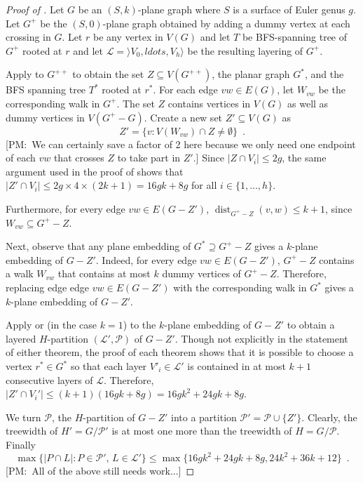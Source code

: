 \documentclass{patmorin}
\newcommand{\note}[2]{{\color{red}[#1:~#2]}}
\DeclareMathOperator{\dist}{dist}
\begin{document}
\begin{proof}[Proof of ]
  Let $G$ be an $(S,k)$-plane graph where $S$ is a surface of Euler genus $g$.  Let $G^+$ be the $(S,0)$-plane graph obtained by adding a dummy vertex at each crossing in $G$.  Let $r$ be any vertex in $V(G)$ and let $T$ be BFS-spanning tree of $G^+$ rooted at $r$ and let $\mathcal{L}=\rangle V_0,ldots,V_h\rangle$ be the resulting layering of $G^+$.
    
  Apply  to $G^{++}$ to obtain the set $Z\subseteq V(G^{++})$, the planar graph $G^*$, and the BFS spanning tree $T^*$ rooted at $r^*$.  For each edge $vw\in E(G)$, let $W_{vw}$ be the corresponding walk in $G^+$. The set $Z$ contains vertices in $V(G)$ as well as dummy vertices in $V(G^+-G)$. Create a new set $Z'\subseteq V(G)$ as
  \[
     Z' = \{ v : V(W_{vw})\cap Z\neq\emptyset \} \enspace .
  \]
  \note{PM}{We can certainly save a factor of 2 here because we only need one endpoint of each $vw$ that crosses $Z$ to take part in $Z'$.}
  Since $|Z\cap V_i| \le 2g$, the same argument used in the proof of  shows that $|Z'\cap V_i|\le 2g\times 4\times (2k+1) = 16gk+8g$ for all $i\in\{1,\ldots,h\}$.  
  
  Furthermore, for every edge $vw\in E(G-Z')$, $\dist_{G^+-Z}(v,w)\le k+1$, since $W_{vw}\subseteq G^+-Z$.
  
  Next, observe that any plane embedding of $G^*\supseteq G^+-Z$ gives a $k$-plane embedding of $G-Z'$. Indeed, for every edge $vw\in E(G-Z')$, $G^+-Z$ contains a walk $W_{vw}$ that contains at most $k$ dummy vertices of $G^+-Z$.  Therefore, replacing edge edge $vw\in E(G-Z')$ with the corresponding walk in $G^*$ gives a $k$-plane embedding of $G-Z'$.
  
  Apply  or (in the case $k=1$)  to the $k$-plane embedding of $G-Z'$ to obtain a layered $H$-partition $(\mathcal{L}',\mathcal{P})$ of $G-Z'$.  Though not explicitly in the statement of either theorem, the proof of each theorem shows that it is possible to choose a vertex $r^*\in G^*$ so that each layer $V'_i\in \mathcal{L}'$ is contained in at most $k+1$ consecutive layers of $\mathcal{L}$.  Therefore, $|Z'\cap V_i'| \le (k+1)(16gk+8g) = 16gk^2 + 24gk + 8g$.
  
  We turn $\mathcal{P}$, the $H$-partition of $G-Z'$ into a partition $\mathcal{P}'=\mathcal{P}\cup \{Z'\}$.  Clearly, the treewidth of $H'=G/\mathcal{P'}$ is at most one more than the treewidth of $H=G/\mathcal{P}$.  Finally
  \[
      \max\{ |P\cap L| : P\in \mathcal{P}',\, L\in \mathcal{L}' \} \le
      \max\{ 16gk^2 + 24gk + 8g, 24k^2 + 36k + 12 \} \enspace .
  \]
  \note{PM}{All of the above still needs work...}
\end{proof}
\end{document}

